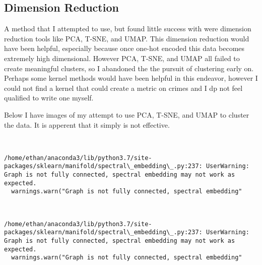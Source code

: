 \documentclass[11pt]{article}
\begin{document}
\hypertarget{dimension-reduction}{%
\subsection{Dimension Reduction}\label{dimension-reduction}}

A method that I attempted to use, but found little success with were
dimension reduction tools like PCA, T-SNE, and UMAP. This dimension
reduction would have been helpful, especially because once one-hot
encoded this data becomes extremely high dimensional. However PCA,
T-SNE, and UMAP all failed to create meaningful clusters, so I abandoned
the the pursuit of clustering early on. Perhaps some kernel methods
would have been helpful in this endeavor, however I could not find a
kernel that could create a metric on crimes and I dp not feel qualified
to write one myself.

Below I have images of my attempt to use PCA, T-SNE, and UMAP to cluster
the data. It is apperent that it simply is not effective.

    \begin{center}
    \end{center}
    { \hspace*{\fill} \\}
    
    \begin{Verbatim}[commandchars=\\\{\}]
/home/ethan/anaconda3/lib/python3.7/site-packages/sklearn/manifold/spectral\_embedding\_.py:237: UserWarning: Graph is not fully connected, spectral embedding may not work as expected.
  warnings.warn("Graph is not fully connected, spectral embedding"

    \end{Verbatim}

    \begin{center}
    \end{center}
    { \hspace*{\fill} \\}
    
    \begin{Verbatim}[commandchars=\\\{\}]
/home/ethan/anaconda3/lib/python3.7/site-packages/sklearn/manifold/spectral\_embedding\_.py:237: UserWarning: Graph is not fully connected, spectral embedding may not work as expected.
  warnings.warn("Graph is not fully connected, spectral embedding"

    \end{Verbatim}
\end{document}
